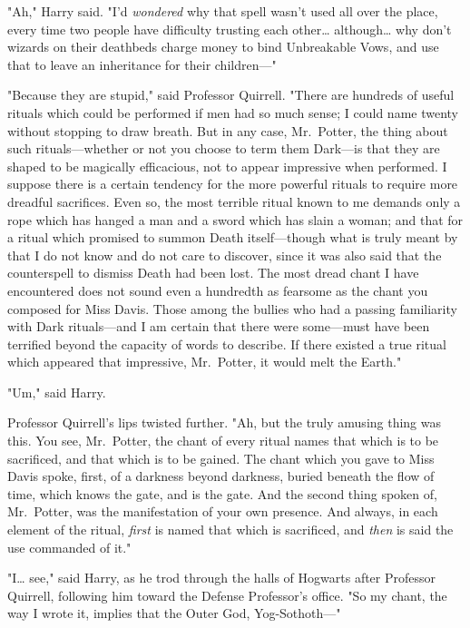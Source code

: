 "Ah," Harry said. "I'd \emph{wondered} why that spell wasn't used all over the 
place, every time two people have difficulty trusting each other{\ldots} 
although{\ldots} why don't wizards on their deathbeds charge money to bind 
Unbreakable Vows, and use that to leave an inheritance for their children---"

"Because they are stupid," said Professor Quirrell. "There are hundreds of 
useful rituals which could be performed if men had so much sense; I could name 
twenty without stopping to draw breath. But in any case, Mr.~Potter, the thing 
about such rituals---whether or not you choose to term them Dark---is that they 
are shaped to be magically efficacious, not to appear impressive when 
performed. I suppose there is a certain tendency for the more powerful rituals 
to require more dreadful sacrifices. Even so, the most terrible ritual known to 
me demands only a rope which has hanged a man and a sword which has slain a 
woman; and that for a ritual which promised to summon Death itself---though 
what is truly meant by that I do not know and do not care to discover, since it 
was also said that the counterspell to dismiss Death had been lost. The most 
dread chant I have encountered does not sound even a hundredth as fearsome as 
the chant you composed for Miss Davis. Those among the bullies who had a 
passing familiarity with Dark rituals---and I am certain that there were 
some---must have been terrified beyond the capacity of words to describe. If 
there existed a true ritual which appeared that impressive, Mr.~Potter, it 
would melt the Earth."

"Um," said Harry.

Professor Quirrell's lips twisted further. "Ah, but the truly amusing thing was 
this. You see, Mr.~Potter, the chant of every ritual names that which is to be 
sacrificed, and that which is to be gained. The chant which you gave to Miss 
Davis spoke, first, of a darkness beyond darkness, buried beneath the flow of 
time, which knows the gate, and is the gate. And the second thing spoken of, 
Mr.~Potter, was the manifestation of your own presence. And always, in each 
element of the ritual, \emph{first} is named that which is sacrificed, and 
\emph{then} is said the use commanded of it."

"I{\ldots} see," said Harry, as he trod through the halls of Hogwarts after 
Professor Quirrell, following him toward the Defense Professor's office. "So my 
chant, the way I wrote it, implies that the Outer God, Yog-Sothoth---"

